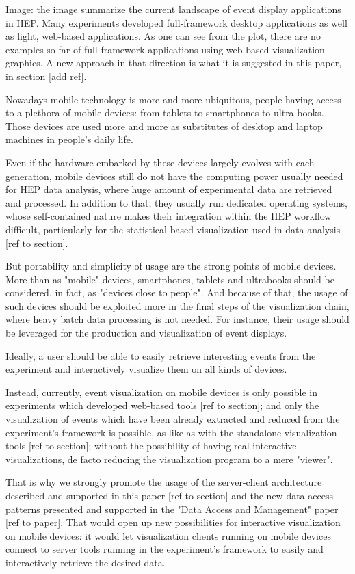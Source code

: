 \documentclass[12pt,a4paper]{article}
\begin{document}
Image: the image summarize the current landscape of event display applications in HEP. Many experiments developed
full-framework desktop applications as well as light, web-based applications. As one can see from the plot, there
are no examples so far of full-framework applications using web-based visualization graphics. A new approach in that
direction is what it is suggested in this paper, in section [add ref].

Nowadays mobile technology is more and more ubiquitous, people having access to a plethora of mobile devices: from tablets to
smartphones to ultra-books. Those devices are used more and more as substitutes of desktop and laptop machines in people's daily life.

Even if the hardware embarked by these devices largely evolves with each generation, mobile devices still do not have the computing
power usually needed for HEP data analysis, where huge amount of experimental data are retrieved and processed. In addition to that,
they usually run dedicated operating systems, whose self-contained nature makes their integration within the HEP workflow difficult,
particularly for the statistical-based visualization used in data analysis [ref to section].

But portability and simplicity of usage are the strong points of mobile devices. More than as "mobile" devices, smartphones,
tablets and ultrabooks should be considered, in fact, as "devices close to people". And because of that, the usage of such devices
should be exploited more in the final steps of the visualization chain, where heavy batch data processing is not needed. For instance,
their usage should be leveraged for the production and visualization of event displays.

Ideally, a user should be able to easily retrieve interesting events from the experiment and interactively visualize them on all
kinds of devices.

Instead, currently, event visualization on mobile devices is only possible in experiments which developed web-based tools [ref to section];
and only the visualization of events which have been already extracted and reduced from the experiment's framework is possible,
as like as with the standalone visualization tools [ref to section]; without the possibility of having real interactive visualizations,
de facto reducing the visualization program to a mere "viewer".

That is why we strongly promote the usage of the server-client architecture described and supported in this paper [ref to section]
and the new data access patterns presented and supported in the "Data Access and Management" paper [ref to paper]. That would open
up new possibilities for interactive visualization on mobile devices: it would let visualization clients running on mobile devices
connect to server tools running in the experiment's framework to easily and interactively retrieve the desired data.
\end{document}
